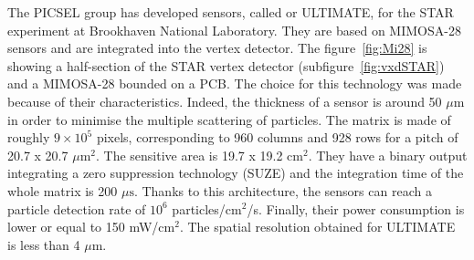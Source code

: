     The PICSEL group has developed sensors, called or ULTIMATE, for the STAR experiment at Brookhaven National Laboratory.
    They are based on \gls{MIMOSA}-28 sensors and are integrated into the vertex detector.
    The figure~\ref{fig:Mi28} is showing a half-section of the STAR vertex detector (subfigure~\ref{fig:vxdSTAR}) and a \gls{MIMOSA}-28 bounded on a PCB.
    The choice for this technology was made because of their characteristics.
    Indeed, the thickness of a sensor is around 50 $\mu\text{m}$ in order to minimise the multiple scattering of particles.
    The matrix is made of roughly $9 \times 10^5$ pixels, corresponding to 960 columns and 928 rows for a pitch of 20.7 x 20.7 $\mu\text{m}^2$.
    The sensitive area is 19.7 x 19.2 $\text{cm}^2$.
    They have a binary output integrating a zero suppression technology (SUZE) and the integration time of the whole matrix is 200 $\mu\text{s}$.
    Thanks to this architecture, the sensors can reach a particle detection rate of $10^6$ particles/$\text{cm}^2$/s. 
    Finally, their power consumption is lower or equal to 150 mW/$\text{cm}^2$.
    The spatial resolution obtained for ULTIMATE is less than 4 $\mu\text{m}$.

